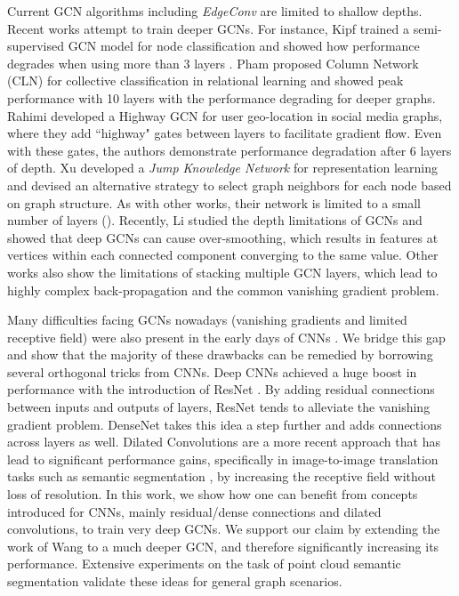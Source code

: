 \documentclass[10pt,twocolumn,letterpaper]{article}
\begin{document}
Current GCN algorithms including \emph{EdgeConv} are limited to shallow depths. Recent works attempt to train deeper GCNs. For instance, Kipf \etal trained a semi-supervised GCN model for node classification and showed how performance degrades when using more than 3 layers \cite{kipf2016semi}. Pham \etal \cite{pham2017column} proposed Column Network (CLN) for collective classification in relational learning and showed peak performance with 10 layers with the performance degrading for deeper graphs. Rahimi \etal \cite{rahimi2018semi} developed a Highway GCN for user geo-location in social media graphs, where they add ``highway" gates between layers to facilitate gradient flow. Even with these gates, the authors demonstrate performance degradation after 6 layers of depth. Xu \etal \cite{xu2018representation} developed a \emph{Jump Knowledge Network} for representation learning and devised an alternative strategy to select graph neighbors for each node based on graph structure. As with other works, their network is limited to a small number of layers (). Recently, Li \etal \cite{li2018deeper} studied the depth limitations of GCNs and showed that deep GCNs can cause over-smoothing, which results in features at vertices within each connected component converging to the same value. Other works \cite{wu2019comprehensive,zhou2018graph} also show the limitations of stacking multiple GCN layers, which lead to highly complex back-propagation and the common vanishing gradient problem. 

Many difficulties facing GCNs nowadays (\eg vanishing gradients and limited receptive field) were also present in the early days of CNNs \cite{he2016deep,yu2015multi}. We bridge this gap and show that the majority of these drawbacks can be remedied by borrowing several orthogonal tricks from CNNs. Deep CNNs achieved a huge boost in performance with the introduction of ResNet \cite{he2016deep}. By adding residual connections between inputs and outputs of layers, ResNet tends to alleviate the vanishing gradient problem. DenseNet \cite{huang2017densely} takes this idea a step further and adds connections across layers as well. Dilated Convolutions \cite{yu2015multi} are a more recent approach that has lead to significant performance gains, specifically in image-to-image translation tasks such as semantic segmentation \cite{yu2015multi}, by increasing the receptive field without loss of resolution. In this work, we show how one can benefit from concepts introduced for CNNs, mainly residual/dense connections and dilated convolutions, to train very deep GCNs. We support our claim by extending the work of Wang \etal \cite{wang2018dynamic} to a much deeper GCN, and therefore significantly increasing its performance. Extensive experiments on the task of point cloud semantic segmentation validate these ideas for general graph scenarios. 
\end{document}
